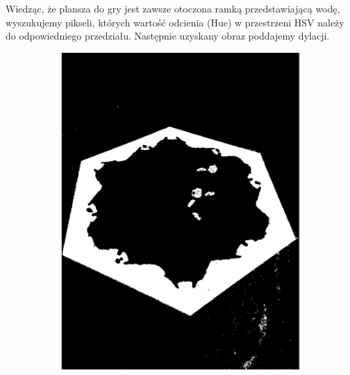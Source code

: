 \documentclass[a4paper]{article}
\begin{document}
    Wiedząc, że plansza do gry jest zawsze otoczona ramką przedstawiającą wodę, wyszukujemy pikseli, których wartość odcienia (Hue) w przestrzeni HSV należy do odpowiedniego przedziału. Następnie uzyskany obraz poddajemy dylacji.
    \begin{figure}[h]
        \begin{subfigure}[]{.5\linewidth}
        \includegraphics[width=\linewidth]{pictures/steps/find_water.png}


\end{subfigure}
\end{figure}
\end{document}
